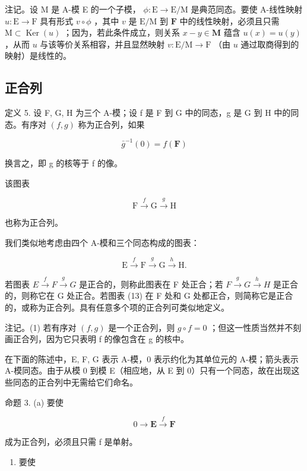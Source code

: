 注记。设 M 是 A-模 E 的一个子模， \(\phi: \mathrm{E} \to \mathrm{E} / \mathrm{M}\) 是典范同态。要使 A-线性映射 \(u: \mathrm{E} \to \mathrm{F}\) 具有形式 \(v \circ \phi\) ，其中 \(v\) 是 \(\mathrm{E} / \mathrm{M}\) 到 \(\mathbf{F}\) 中的线性映射，必须且只需 \(\mathrm{M} \subset \operatorname{Ker}(u)\) ；因为，若此条件成立，则关系 \(x - y \in \mathbf{M}\) 蕴含 \(u(x) = u(y)\) ，从而 \(u\) 与该等价关系相容，并且显然映射 \(v: \mathrm{E} / \mathrm{M} \to \mathrm{F}\) （由 \(u\) 通过取商得到的映射）是线性的。

\subsection{正合列}

定义 5. 设 F, G, H 为三个 A-模；设 f 是 F 到 G 中的同态，g 是 G 到 H 中的同态。有序对 \((f, g)\) 称为正合列，如果

\[
\bar {g} ^ {- 1} (0) = f (\mathbf {F})
\]

换言之，即 g 的核等于 f 的像。

该图表

\[
\mathrm{F} \xrightarrow {f} \mathrm{G} \xrightarrow {g} \mathrm{H}\tag{12}
\]

也称为正合列。

我们类似地考虑由四个 A-模和三个同态构成的图表：

\[
\mathrm{E} \xrightarrow {f} \mathrm{F} \xrightarrow {g} \mathrm{G} \xrightarrow {h} \mathrm{H}.\tag{13}
\]

若图表 \(E \xrightarrow{f} F \xrightarrow{g} G\) 是正合的，则称此图表在 F 处正合；若 \(F \xrightarrow{g} G \xrightarrow{h} H\) 是正合的，则称它在 G 处正合。若图表 (13) 在 F 处和 G 处都正合，则简称它是正合的，或称为正合列。具有任意多个项的正合列可类似地定义。

注记。(1) 若有序对 \((f, g)\) 是一个正合列，则 \(g \circ f = 0\) ；但这一性质当然并不刻画正合列，因为它只表明 f 的像包含在 g 的核中。

在下面的陈述中，E, F, G 表示 A-模，0 表示约化为其单位元的 A-模；箭头表示 A-模同态。由于从模 0 到模 E（相应地，从 E 到 0）只有一个同态，故在出现这些同态的正合列中无需给它们命名。

命题 3. (a) 要使

\[
0 \longrightarrow \mathbf {E} \stackrel {f} {\longrightarrow} \mathbf {F}
\]

成为正合列，必须且只需 f 是单射。

\begin{enumerate}
\def\labelenumi{(\alph{enumi})}
\setcounter{enumi}{1}
\tightlist
\item
  要使
\end{enumerate}

